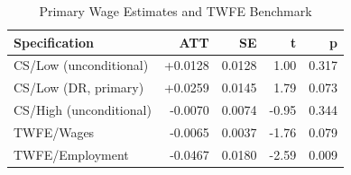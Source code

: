 \begin{table}[ht]
\centering
\begin{tabular}{lrrrr}
  \toprule
Specification & ATT & SE & t & p \\ 
  \midrule
CS/Low (unconditional) & +0.0128 & 0.0128 & 1.00 & 0.317 \\ 
  CS/Low (DR, primary) & +0.0259 & 0.0145 & 1.79 & 0.073 \\ 
  CS/High (unconditional) & -0.0070 & 0.0074 & -0.95 & 0.344 \\ 
  TWFE/Wages & -0.0065 & 0.0037 & -1.76 & 0.079 \\ 
  TWFE/Employment & -0.0467 & 0.0180 & -2.59 & 0.009 \\ 
   \bottomrule
\end{tabular}
\caption{Primary Wage Estimates and TWFE Benchmark} 
\label{tab:primary}
\end{table}
